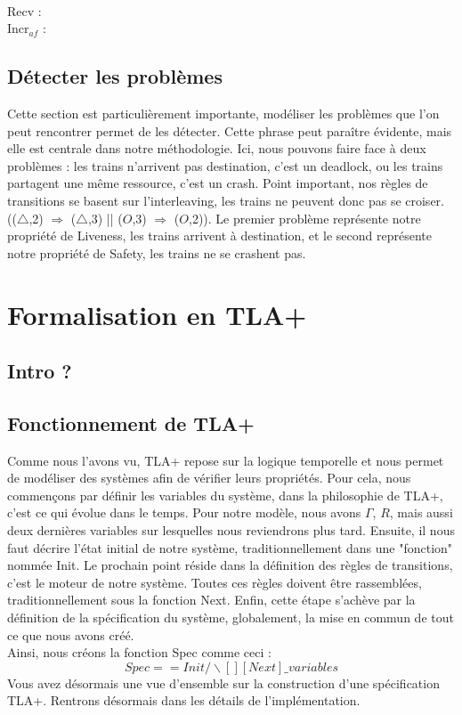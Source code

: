 \documentclass[runningheads]{llncs}
\begin{document}
\noindent
\\Recv : 
\\Incr$_{af}$ :



\subsection{Détecter les problèmes}
Cette section est particulièrement importante, modéliser les problèmes que l'on peut rencontrer permet de les détecter.
Cette phrase peut paraître évidente, mais elle est centrale dans notre méthodologie. Ici, nous pouvons faire face à deux problèmes : 
les trains n'arrivent pas destination, c'est un deadlock, ou les trains partagent une même ressource, c'est un crash. 
Point important, nos règles de transitions se basent sur l'interleaving, les trains ne peuvent donc pas se croiser. (($\triangle$,2) $\Rightarrow$ ($\triangle$,3) || ($O$,3) $\Rightarrow$ ($O$,2)).
Le premier problème représente notre propriété de Liveness, les trains arrivent à destination, et le second représente notre propriété de Safety, les trains ne se crashent pas.

\section{Formalisation en TLA+}
\label{sec:tla-formalisation}

\subsection{Intro ?}

\subsection{Fonctionnement de TLA+}
Comme nous l'avons vu, TLA+ repose sur la logique temporelle et nous permet de modéliser des systèmes afin de vérifier leurs propriétés.
Pour cela, nous commençons par définir les variables du système, dans la philosophie de TLA+, c'est ce qui évolue dans le temps. 
Pour notre modèle, nous avons $\Gamma$, $R$, mais aussi deux dernières variables sur lesquelles nous reviendrons plus tard.
Ensuite, il nous faut décrire l'état initial de notre système, traditionnellement dans une "fonction" nommée Init.
Le prochain point réside dans la définition des règles de transitions, c'est le moteur de notre système. 
Toutes ces règles doivent être rassemblées, traditionnellement sous la fonction Next. 
Enfin, cette étape s'achève par la définition de la spécification du système, globalement, la mise en commun de tout ce que nous avons créé.
\\Ainsi, nous créons la fonction Spec comme ceci : \textit{$$Spec == Init /\backslash [][Next]\_variables$$} %
Vous avez désormais une vue d'ensemble sur la construction d'une spécification TLA+.
Rentrons désormais dans les détails de l'implémentation.
\end{document}
